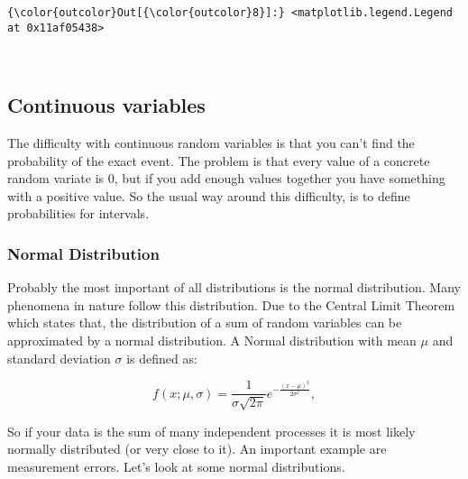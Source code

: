 \documentclass[11pt]{article}
\begin{document}
\begin{Verbatim}[commandchars=\\\{\}]
{\color{outcolor}Out[{\color{outcolor}8}]:} <matplotlib.legend.Legend at 0x11af05438>
\end{Verbatim}
            
    \begin{center}
    \end{center}
    { \hspace*{\fill} \\}
    
    \subsection{Continuous variables}\label{continuous-variables}

The difficulty with continuous random variables is that you can't find
the probability of the exact event. The problem is that every value of a
concrete random variate is \(0\), but if you add enough values together
you have something with a positive value. So the usual way around this
difficulty, is to define probabilities for intervals.

    \subsubsection{Normal Distribution}\label{normal-distribution}

Probably the most important of all distributions is the normal
distribution. Many phenomena in nature follow this distribution. Due to
the Central Limit Theorem which states that, the distribution of a sum
of random variables can be approximated by a normal distribution. A
Normal distribution with mean \(\mu\) and standard deviation \(\sigma\)
is defined as:

\[ f(x; \mu, \sigma) = \frac{1}{\sigma\sqrt{2\pi}} e^{ -\frac{(x-\mu)^2}{2\sigma^2} }, \]

So if your data is the sum of many independent processes it is most
likely normally distributed (or very close to it). An important example
are measurement errors. Let's look at some normal distributions.
\end{document}
